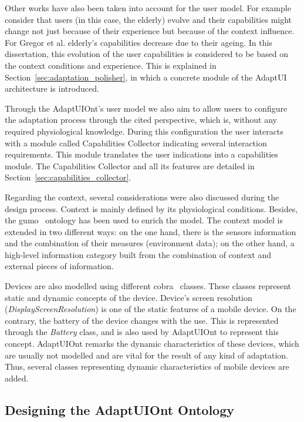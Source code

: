 Other works have also been taken into account for the user model. For example
~\citet{gregor_designing_2002} consider that users (in this case, the elderly)
evolve and their capabilities might change not just because of their experience
but because of the context influence. For Gregor et al. elderly's capabilities
decrease due to their ageing. In this dissertation, this evolution of the user
capabilities is considered to be based on the context conditions and experience.
This is explained in Section~\ref{sec:adaptation_polisher}, in which a concrete
module of the AdaptUI architecture is introduced.

Through the AdaptUIOnt's user model we also aim to allow users to configure
the adaptation process through the cited perspective, which is, without any required
physiological knowledge. During this configuration the user interacts with a
module called Capabilities Collector indicating several interaction requirements.
This module translates the user indications into a capabilities module. The
Capabilities Collector and all its features are detailed in
Section~\ref{sec:capabilities_collector}.

Regarding the context, several considerations were also discussed during the design
process. Context is mainly defined by its physiological conditions. Besides,
the \ac{gumo}~\citep{heckmann_gumogeneral_2005} ontology has been used to enrich the
model. The context model is extended in two different ways: on the one hand,
there is the sensors information and the combination of their measures (environment
data); on the other hand, a high-level information category built from the
combination of context and external pieces of information.

Devices are also modelled using different \ac{cobra}~\citep{cobra} classes. These
classes represent static and dynamic concepts of the device. Device's screen
resolution (\textit{DisplayScreenResolution}) is one of the static features of a
mobile device. On the contrary, the battery of the device changes with the use.
This is represented through the \textit{Battery} class, and is also used by
AdaptUIOnt to represent this concept. AdaptUIOnt remarks the dynamic characteristics
of these devices, which are usually not modelled and are vital for the result of
any kind of adaptation. Thus, several classes representing dynamic characteristics
of mobile devices are added.



\subsection{Designing the AdaptUIOnt Ontology}
\label{sec:model_detail}

